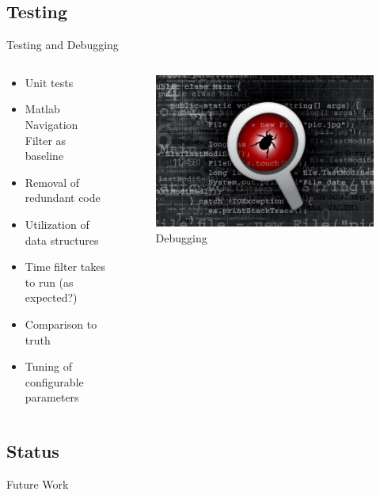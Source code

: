 \documentclass[10pt, handout, aspectratio=169]{beamer}
\begin{document}
\subsection{Testing}
	\begin{frame}{Testing and Debugging}
		\begin{columns}
			\begin{column}{0.6\textwidth}
        \begin{itemize}
        	\item Unit tests
        	\item Matlab Navigation Filter as baseline
        	\item Removal of redundant code
        	\item Utilization of data structures
        	\item Time filter takes to run (as expected?)
        	\item Comparison to truth
        	\item Tuning of configurable parameters
        \end{itemize}
			\end{column}
			\begin{column}{0.4\textwidth}
    			\begin{figure}
            \centering
     				\includegraphics[width=1\textwidth]{bug}
            \caption{Debugging\cite{bug:2013}}
     			\end{figure}
			\end{column}
		\end{columns}
	\end{frame}

\subsection{Status}
	\begin{frame}{Future Work}
		\color{red}{TBD based on final progress}
	\end{frame}
\end{document}
